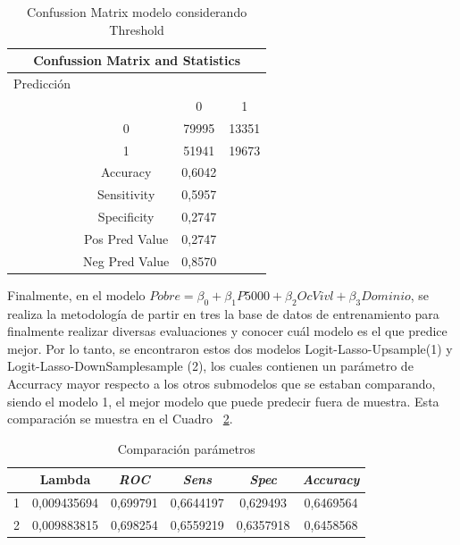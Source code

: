 \documentclass[conference, 10pt]{IEEEtran}
\begin{document}
\begin{table}[htbp]
\caption{Confussion Matrix modelo considerando Threshold }
\begin{center}
\begin{tabular}{|c c c c|}
\hline
\multicolumn{4}{|c|}{\textbf{Confussion Matrix and Statistics}} \\
\cline{1-4} 
\hline
 Predicción&& &\\
 & &0&1\\
 &0&79995&13351\\
  &1&51941&19673\\
	\hline
&{Accuracy}&0,6042& \\
	&{Sensitivity} &0,5957& \\
&{Specificity} &0,2747& \\
&{Pos Pred Value}&0,2747& \\
& {Neg Pred Value} &0,8570& \\
\hline
\end{tabular}
\label{tab_8}
\end{center}
\end{table}

Finalmente, en el modelo $Pobre = \beta_0+\beta_{1}P5000 +\beta_{2}OcVivl+\beta_{3}Dominio$, se realiza la metodología de partir en tres la base de datos de entrenamiento para finalmente realizar diversas evaluaciones y conocer cuál modelo es el que predice mejor. Por lo tanto, se encontraron estos dos modelos Logit-Lasso-Upsample(1) y Logit-Lasso-DownSamplesample (2), los cuales contienen un parámetro de Accurracy mayor respecto a los otros submodelos que se estaban comparando, siendo el modelo 1, el mejor modelo que puede predecir fuera de muestra. Esta comparación se muestra en el Cuadro ~\ref{tab_9}.

\begin{table}[htbp]
\caption{Comparación parámetros}
\begin{center}
\begin{tabular}{|c|c|c|c|c|c|}
\hline
&\textbf{Lambda} & \textbf{\textit{ROC}}& \textbf{\textit{Sens}} & \textbf{\textit{Spec}}& \textbf{\textit{Accuracy}}\\
\hline
1&0,009435694& 0,699791   &0,6644197  &0,629493 &0,6469564 \\
\hline
2&0,009883815& 0,698254   &0,6559219  &0,6357918 &0,6458568 \\
\hline
\end{tabular}
\label{tab_9}
\end{center}
\end{table}
\end{document}

